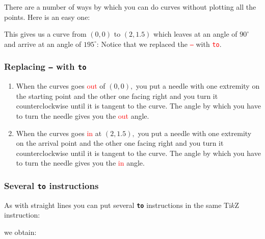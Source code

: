 %
%
\begin{frame}[fragile]

  There are a number of ways by which you can do curves without plotting all the points. Here is an easy one:

  
  
  This gives us a curve from $(0,0)$ to $(2,1.5)$ which leaves at an angle of $90^\circ$ and arrive at an angle of $195^\circ$: Notice that we replaced the \textcolor{red}{\tt  --} with \textcolor{red}{\tt to}.

  \begin{center}
    
  \end{center}
  
\end{frame}
%
%
\begin{frame}
  \frametitle{
    Replacing \textbf{\tt  --} with \textbf{\tt to}
  }

  \begin{center}
  \end{center}
  
  \begin{enumerate}
  \item
    When the curves goes \textcolor{red}{out} of $(0,0),$ you put a needle with one extremity on the starting point and the other one facing right and you turn it counterclockwise until it is tangent to the curve. The angle by which you have to turn the needle gives you the \textcolor{red}{out} angle.
  \item
    When the curves goes \textcolor{red}{in} at $(2,1.5),$ you put a needle with one extremity on the arrival point and the other one facing right and you turn it counterclockwise until it is tangent to the curve. The angle by which you have to turn the needle gives you the \textcolor{red}{in} angle.
  \end{enumerate}

\end{frame}

%
%
\begin{frame}[fragile]
  \frametitle{
    Several \textbf{\tt to} instructions
  }
  
  As with straight lines you can put several \textbf{\tt to} instructions in the same Ti$k$Z instruction:

  
  
  we obtain:

  \begin{center}
    
  \end{center}
  
\end{frame}
